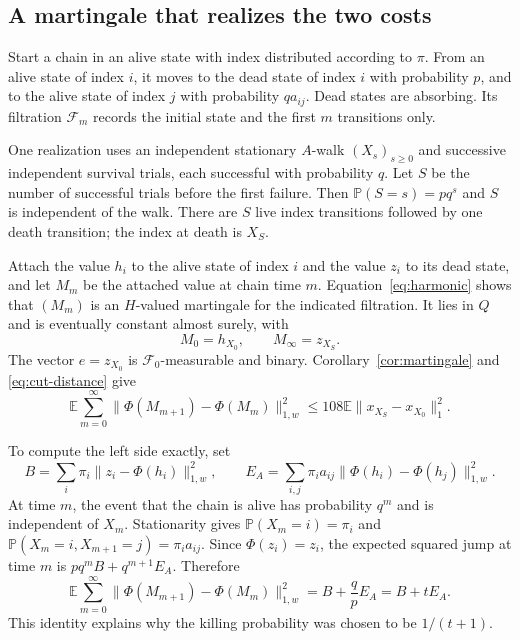 \documentclass[11pt]{article}
\theoremstyle{definition}
\theoremstyle{remark}
\numberwithin{equation}{section}
\newcommand{\E}{\mathbb E}
\newcommand{\Prob}{\mathbb P}
\newcommand{\calF}{\mathcal F}
\begin{document}
\subsection{A martingale that realizes the two costs}
Start a chain in an alive state with index distributed according
to $\pi$. From an alive state of index $i$, it moves to the
dead state of index $i$ with probability $p$, and to the alive
state of index $j$ with probability $qa_{ij}$. Dead states are
absorbing. Its filtration $\calF_m$ records the initial state
and the first $m$ transitions only.

One realization uses an independent stationary $A$-walk
$(X_s)_{s\geq0}$ and successive independent survival trials,
each successful with probability $q$. Let $S$ be the number of
successful trials before the first failure. Then
$\Prob(S=s)=pq^s$ and $S$ is independent of the walk. There
are $S$ live index transitions followed by one death transition;
the index at death is $X_S$.

Attach the value $h_i$ to the alive state of index $i$ and the
value $z_i$ to its dead state, and let $M_m$ be the attached
value at chain time $m$. Equation~\eqref{eq:harmonic} shows
that $(M_m)$ is an $H$-valued martingale for the indicated
filtration. It lies in $Q$ and is eventually constant almost
surely, with
\[
 M_0=h_{X_0},\qquad M_\infty=z_{X_S}.
\]
The vector $e=z_{X_0}$ is $\calF_0$-measurable and binary.
Corollary~\ref{cor:martingale} and \eqref{eq:cut-distance}
give
\begin{equation}\label{eq:stopped-bound}
 \E\sum_{m=0}^\infty
 \|\Phi(M_{m+1})-\Phi(M_m)\|_{1,w}^2
 \leq108\E\|x_{X_S}-x_{X_0}\|_1^2.
\end{equation}

To compute the left side exactly, set
\[
 B=\sum_i\pi_i\|z_i-\Phi(h_i)\|_{1,w}^2,
 \qquad
 E_A=\sum_{i,j}\pi_i a_{ij}
             \|\Phi(h_i)-\Phi(h_j)\|_{1,w}^2.
\]
At time $m$, the event that the chain is alive has probability
$q^m$ and is independent of $X_m$. Stationarity gives
$\Prob(X_m=i)=\pi_i$ and
$\Prob(X_m=i,X_{m+1}=j)=\pi_i a_{ij}$.
Since $\Phi(z_i)=z_i$, the expected squared jump at time $m$
is $pq^m B+q^{m+1}E_A$. Therefore
\begin{equation}\label{eq:jump-identity}
 \E\sum_{m=0}^\infty
 \|\Phi(M_{m+1})-\Phi(M_m)\|_{1,w}^2
 =B+\frac qp E_A=B+tE_A.
\end{equation}
This identity explains why the killing probability was chosen
to be $1/(t+1)$.
\end{document}
